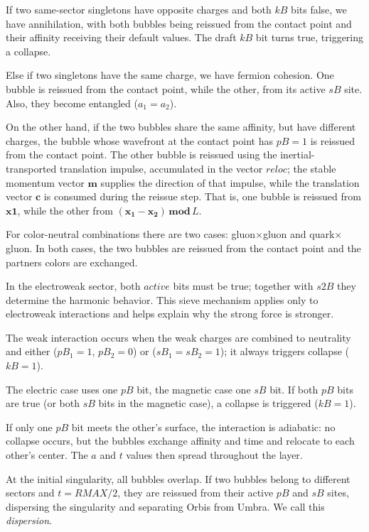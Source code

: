 \documentclass{ijuc}
\begin{document}
If two same-sector singletons have opposite charges and both $kB$ bits false, we have annihilation, with both bubbles being reissued from the contact point and their affinity receiving their default values. The draft $kB$ bit turns true, triggering a collapse.

Else if two singletons have the same charge, we have fermion cohesion. 
One bubble is reissued from the contact point, while the other, from its active $sB$ site. 
Also, they become entangled ($a_1=a_2$).

On the other hand, if the two bubbles share the same affinity, but have different charges, the bubble whose wavefront at the contact point has $pB=1$ is reissued from the contact point.
The other bubble is reissued using the inertial-transported translation impulse, accumulated in the vector $\boldsymbol{\mathit{reloc}}$; the stable momentum vector $\boldsymbol{m}$ supplies the direction of that impulse, while the translation vector $\boldsymbol{c}$ is consumed during the reissue step.
That is, one bubble is reissued from $\boldsymbol{x1}$, while the other from $(\boldsymbol{x_1}-\boldsymbol{x_2})\,\boldsymbol{mod}\,L$.

For color-neutral combinations there are two cases: gluon$\times$gluon and quark$\times$gluon. 
In both cases, the two bubbles are reissued from the contact point and the partners colors are exchanged.

In the electroweak sector, both $\mathit{active}$ bits must be true; together with $s2B$ they determine the harmonic behavior. This sieve mechanism applies only to electroweak interactions and helps explain why the strong force is stronger.

The weak interaction occurs when the weak charges are combined to neutrality and either ($pB_1=1$, $pB_2=0$) or ($sB_1=sB_2=1$); it always triggers collapse ($kB=1$).

The electric case uses one $pB$ bit, the magnetic case one $sB$ bit. If both $pB$ bits are true (or both $sB$ bits in the magnetic case), a collapse is triggered ($kB=1$).

If only one $pB$ bit meets the other's surface, the interaction is adiabatic: no collapse occurs, but the bubbles exchange affinity and time and relocate to each other's center. The $a$ and $t$ values then spread throughout the layer.

At the initial singularity, all bubbles overlap. If two bubbles belong to different sectors and $t=RMAX/2$, they are reissued from their active $pB$ and $sB$ sites, dispersing the singularity and separating Orbis from Umbra. We call this \textit{dispersion}.
\end{document}
